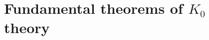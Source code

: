 \documentclass[12pt]{report}
\numberwithin{equation}{section}
\newcommand{\Z}{\mathbb{Z}}
\newcommand{\N}{\mathbb{N}}
\newcommand{\image}{{\mathrm{Im}}}
\newtheorem{definition}[dummy]{Definition}
\newtheorem{proposition}[dummy]{Proposition}
\begin{document}
		\chapter{Fundamental theorems of $K_0$ theory}
\end{document}
